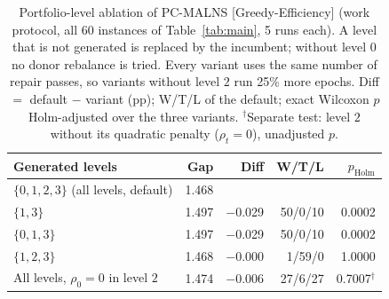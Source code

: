 \begin{table}[pos=!htb]
\centering
\caption{Portfolio-level ablation of PC-MALNS [Greedy-Efficiency] (work protocol, all 60 instances of Table~\ref{tab:main}, 5 runs each). A level that is not generated is replaced by the incumbent; without level $0$ no donor rebalance is tried. Every variant uses the same number of repair passes, so variants without level $2$ run 25\% more epochs. Diff $=$ default $-$ variant (pp); W/T/L of the default; exact Wilcoxon $p$ Holm-adjusted over the three variants. $^{\dagger}$Separate test: level $2$ without its quadratic penalty ($\rho_t = 0$), unadjusted $p$.}
\label{tab:levels}
\footnotesize
\begin{tabular}{@{}lrrrr@{}}
\toprule
Generated levels & Gap & Diff & W/T/L & $p_{\text{Holm}}$ \\
\midrule
$\{0,1,2,3\}$ (all levels, default) & 1.468 & & & \\
$\{1,3\}$ & 1.497 & $-$0.029 & 50/0/10 & 0.0002 \\
$\{0,1,3\}$ & 1.497 & $-$0.029 & 50/0/10 & 0.0002 \\
$\{1,2,3\}$ & 1.468 & $-$0.000 & 1/59/0 & 1.0000 \\
\addlinespace
All levels, $\rho_0 = 0$ in level $2$ & 1.474 & $-$0.006 & 27/6/27 & 0.7007$^{\dagger}$ \\
\bottomrule
\end{tabular}
\end{table}
